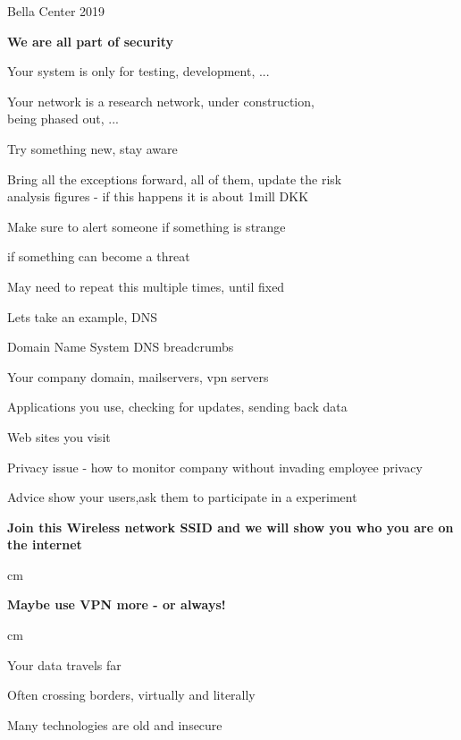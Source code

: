 \documentclass[Screen16to9,17pt,footrule]{foils}
\begin{document}
{Bella Center 2019}

\vskip 10mm
\centerline{\bf\Large We are all part of security}




Your system is only for testing, development, ...

Your network is a research network, under construction, \\
being phased out, ...

Try something new, stay aware

Bring all the exceptions forward, all of them, update the risk \\
analysis figures - if this happens it is about 1mill DKK

Make sure to alert someone if something is strange

if something can become a threat

May need to repeat this multiple times, until fixed



\begin{list1}
\item Lets take an example, DNS
\item Domain Name System DNS breadcrumbs
\begin{list2}
\item Your company domain, mailservers, vpn servers
\item Applications you use, checking for updates, sending back data
\item Web sites you visit
\item Privacy issue - how to monitor company without invading employee privacy
\end{list2}
\vskip 1cm
\item Advice show your users,ask them to participate in a experiment
\item {\bf Join this Wireless network SSID and we will show you who you are on the internet}
\end{list1}


 cm
\centerline{\bf\Large Maybe use VPN more - or always!}
 cm




\begin{list2}
\item Your data travels far
\item Often crossing borders, virtually and literally
\item Many technologies are old and insecure
\end{list2}
\end{document}
